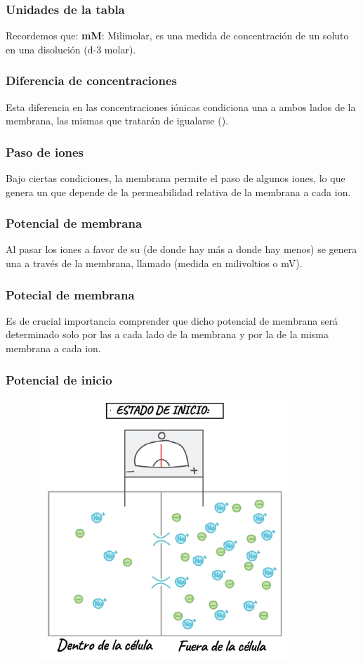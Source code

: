 \documentclass[14pt]{beamer}
\begin{document}
\begin{frame}
\frametitle{Unidades de la tabla}
Recordemos que: \textbf{mM}: \pause Milimolar, es una medida de concentración de un soluto en una disolución (\num{d-3} molar).
\end{frame}
\begin{frame}
\frametitle{Diferencia de concentraciones}
Esta diferencia en las concentraciones iónicas condiciona una  a ambos lados de la membrana, \pause las mismas que tratarán de igualarse ().
\end{frame}
\begin{frame}
\frametitle{Paso de iones}
Bajo ciertas condiciones, la membrana permite el paso de algunos iones, \pause lo que genera un  que depende de la permeabilidad relativa de la membrana a cada ion.
\end{frame}
\begin{frame}
\frametitle{Potencial de membrana}
Al pasar los iones a favor de su  (de donde hay más a donde hay menos) \pause se genera una  a través de la membrana, \pause llamado  (medida en milivoltios o mV).
\end{frame}
\begin{frame}
\frametitle{Potecial de membrana}
Es de crucial importancia comprender que dicho potencial de membrana será determinado solo por las  a cada lado de la membrana \pause y por la  de la misma membrana a cada ion.
\end{frame}
\begin{frame}
\frametitle{Potencial de inicio}
\vspace*{-0.75cm}
\begin{figure}
    \centering
    \includegraphics[scale=0.6]{Imagenes/Potencial_Accion_04.png}
\end{figure}
\end{frame}
\end{document}
